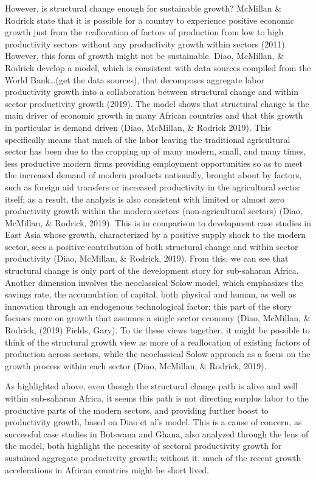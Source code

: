 \documentclass[
  12pt,
  letterpaper,
  DIV=11,
  numbers=noendperiod]{scrartcl}
\begin{document}
However, is structural change enough for sustainable growth? McMillan \&
Rodrick state that it is possible for a country to experience positive
economic growth just from the reallocation of factors of production from
low to high productivity sectors without any productivity growth within
sectors (2011). However, this form of growth might not be sustainable.
Diao, McMillan, \& Rodrick develop a model, which is consistent with
data sources compiled from the World Bank\ldots(get the data sources),
that decomposes aggregate labor productivity growth into a collaboration
between structural change and within sector productivity growth (2019).
The model shows that structural change is the main driver of economic
growth in many African countries and that this growth in particular is
demand driven (Diao, McMillan, \& Rodrick 2019). This specifically means
that much of the labor leaving the traditional agricultural sector has
been due to the cropping up of many modern, small, and many times, less
productive modern firms providing employment opportunities so as to meet
the increased demand of modern products nationally, brought about by
factors, such as foreign aid transfers or increased productivity in the
agricultural sector itself; as a result, the analysis is also consistent
with limited or almost zero productivity growth within the modern
sectors (non-agricultural sectors) (Diao, McMillan, \& Rodrick, 2019).
This is in comparison to development case studies in East Asia whose
growth, characterized by a positive supply shock to the modern sector,
sees a positive contribution of both structural change and within sector
productivity (Diao, McMillan, \& Rodrick, 2019). From this, we can see
that structural change is only part of the development story for
sub-saharan Africa. Another dimension involves the neoclassical Solow
model, which emphasizes the savings rate, the accumulation of capital,
both physical and human, as well as innovation through an endogenous
technological factor; this part of the story focuses more on growth that
assumes a single sector economy (Diao, McMillan, \& Rodrick, (2019)
Fields, Gary). To tie these views together, it might be possible to
think of the structural growth view as more of a reallocation of
existing factors of production across sectors, while the neoclassical
Solow approach as a focus on the growth process within each sector
(Diao, McMillan, \& Rodrick, 2019).

As highlighted above, even though the structural change path is alive
and well within sub-saharan Africa, it seems this path is not directing
surplus labor to the productive parts of the modern sectors, and
providing further boost to productivity growth, based on Diao et al's
model. This is a cause of concern, as successful case studies in
Botswana and Ghana, also analyzed through the lens of the model, both
highlight the necessity of sectoral productivity growth for sustained
aggregate productivity growth; without it, much of the recent growth
accelerations in African countries might be short lived.
\end{document}
